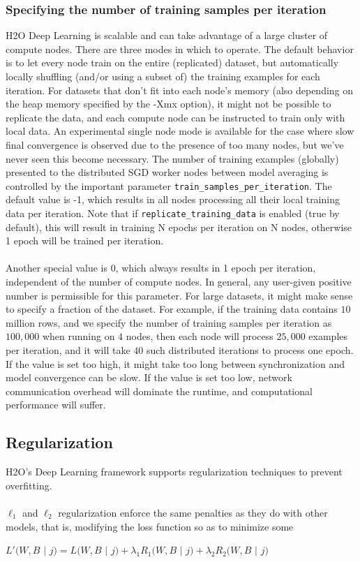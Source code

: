 \documentclass[11pt]{article}
\begin{document}
\subsubsection{Specifying the number of training samples per iteration} \label{2.2.4}
H2O Deep Learning is scalable and can take advantage of a large cluster of compute nodes. There are three modes in which to operate. The default behavior is to let every node train on the entire (replicated) dataset, but automatically locally shuffling (and/or using a subset of) the training examples for each iteration. For datasets that don't fit into each node's memory (also depending on the heap memory specified by the -Xmx option), it might not be possible to replicate the data, and each compute node can be instructed to train only with local data. An experimental single node mode is available for the case where slow final convergence is observed due to the presence of too many nodes, but we've never seen this become necessary.
The number of training examples (globally) presented to the distributed SGD worker nodes between model averaging is controlled by the important parameter \texttt{train\_samples\_per\_iteration}. The default value is -1, which results in all nodes processing all their local training data per iteration. Note that if \texttt{replicate\_training\_data} is enabled (true by default), this will result in training N epochs per iteration on N nodes, otherwise 1 epoch will be trained per iteration. \\ \\ Another special value is 0, which always results in 1 epoch per iteration, independent of the number of compute nodes. In general, any user-given positive number is permissible for this parameter. For large datasets, it might make sense to specify a fraction of the dataset. For example, if the training data contains $10$ million rows, and we specify the number of training samples per iteration as $100,000$ when running on $4$ nodes, then each node will process $25,000$ examples per iteration, and it will take $40$ such distributed iterations to process one epoch. If the value is set too high, it might take too long between synchronization and model convergence can be slow.  If the value is set too low, network communication overhead will dominate the runtime, and computational performance will suffer.
\\
\noindent
\subsection{Regularization} \label{2.3}
H2O's Deep Learning framework supports regularization techniques to prevent overfitting. 
\\
\\
$\ell_1$ and $\ell_2$ regularization enforce the same penalties as they do with other models, that is, modifying the loss function so as to minimize some
\\
\begin{center}
$L'(W,B$ $|$ $j) = L(W,B$ $|$ $j) + \lambda_1 R_1(W,B$ $|$ $j) + \lambda_2 R_2(W,B$ $|$ $j)$
\end{center}
\end{document}
